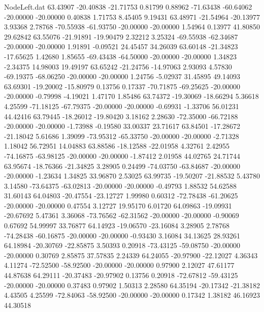 \begin{filecontents}{NodeLeft.dat}
  63.43907  -20.40838  -21.71753     0.81799    0.88962  -71.63438  -60.64062  -20.00000  -20.00000    0.40838    1.71753    8.45405    9.19431
  63.48971  -21.54964  -20.13977     3.93368    2.78768  -70.55938  -61.93750  -20.00000  -20.00000    1.54964    0.13977   41.80850   29.62842
  63.55076  -21.91891  -19.90479     2.32212    3.25324  -69.55938  -62.34687  -20.00000  -20.00000    1.91891   -0.09521   24.45457   34.26039
  63.60148  -21.34823  -17.65625     1.42680    1.85655  -69.43438  -64.50000  -20.00000  -20.00000    1.34823   -2.34375   14.98003   19.49197
  63.65242  -21.24756  -14.97063     2.93093    4.57830  -69.19375  -68.06250  -20.00000  -20.00000    1.24756   -5.02937   31.45895   49.14093
  63.69301  -19.20002  -15.80979     0.13756    0.17337  -70.71875  -69.25625  -20.00000  -20.00000   -0.79998   -4.19021    1.47170    1.85486
  63.74372  -19.30069  -18.66294     5.36618    4.25599  -71.18125  -67.79375  -20.00000  -20.00000   -0.69931   -1.33706   56.01231   44.42416
  63.79445  -18.26012  -19.80420     3.18162    2.28630  -72.35000  -66.72188  -20.00000  -20.00000   -1.73988   -0.19580   33.00337   23.71617
  63.84501  -17.28672  -21.18042     5.61686    1.39099  -73.95312  -65.33750  -20.00000  -20.00000   -2.71328    1.18042   56.72951   14.04883
  63.88586  -18.12588  -22.01958     4.32761    2.42955  -74.16875  -63.98125  -20.00000  -20.00000   -1.87412    2.01958   44.02765   24.71744
  63.95674  -18.76366  -21.34825     3.28905    0.24499  -74.03750  -63.84687  -20.00000  -20.00000   -1.23634    1.34825   33.96870    2.53025
  63.99735  -19.50207  -21.88532     5.43780    3.14580  -73.64375  -63.02813  -20.00000  -20.00000   -0.49793    1.88532   54.62588   31.60143
  64.04803  -20.47554  -23.12727     1.99980    0.60312  -72.78438  -61.20625  -20.00000  -20.00000    0.47554    3.12727   19.95170    6.01720
  64.09863  -19.09931  -20.67692     5.47361    3.36068  -73.76562  -62.31562  -20.00000  -20.00000   -0.90069    0.67692   54.99997   33.76877
  64.14923  -19.06570  -23.16084     3.28905    2.78768  -74.28438  -60.16875  -20.00000  -20.00000   -0.93430    3.16084   34.13625   28.93261
  64.18984  -20.30769  -22.85875     3.50393    0.20918  -73.43125  -59.08750  -20.00000  -20.00000    0.30769    2.85875   37.57835    2.24339
  64.24055  -20.97900  -22.12027     4.36343    4.11274  -72.52500  -58.92500  -20.00000  -20.00000    0.97900    2.12027   47.61177   44.87638
  64.29111  -20.37483  -20.97902     0.13756    0.20918  -72.67812  -59.43125  -20.00000  -20.00000    0.37483    0.97902    1.50313    2.28580
  64.35194  -20.17342  -21.38182     4.43505    4.25599  -72.84063  -58.92500  -20.00000  -20.00000    0.17342    1.38182   46.16923   44.30518

\end{filecontents}
